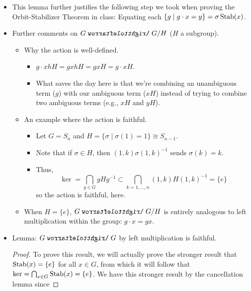 \documentclass[../notes.tex]{subfiles}
\begin{document}
\begin{itemize}
\begin{enumerate}
\begin{proof}
\begin{align*}
                \sigma^{-1}\cdot(g\cdot x) &= \sigma^{-1}\cdot(\sigma\cdot x)\\
                \sigma^{-1}g\cdot x &= x
            \end{align*}
            This implies that $\sigma^{-1}g\in H$, i.e., that $g\in\sigma H$, as desired.
        \end{proof}
    \end{enumerate}
    \item This lemma further justifies the following step we took when proving the Orbit-Stabilizer Theorem in class: Equating each $\{g\mid g\cdot x=y\}=\sigma\operatorname{Stab}(x)$.
    \item Further comments on $G\acts G/H$ ($H$ a subgroup).
    \begin{itemize}
        \item Why the action is well-defined.
        \begin{itemize}
            \item $g\cdot xhH=gxhH=gxH=g\cdot xH$.
            \item What saves the day here is that we're combining an unambiguous term ($g$) with our ambiguous term ($xH$) instead of trying to combine two ambiguous terms (e.g., $xH$ and $yH$).
        \end{itemize}
        \item An example where the action is faithful.
        \begin{itemize}
            \item Let $G=S_n$ and $H=\{\sigma\mid\sigma(1)=1\}\cong S_{n-1}$.
            \item Note that if $\sigma\in H$, then $(1,k)\sigma(1,k)^{-1}$ sends $\sigma(k)=k$.
            \item Thus,
            \begin{equation*}
                \ker = \bigcap_{g\in G}gHg^{-1} 
                \subset \bigcap_{k=1,\dots,n}(1,k)H(1,k)^{-1}
                = \{e\}
            \end{equation*}
            so the action is faithful, here.
        \end{itemize}
        \item When $H=\{e\}$, $G\acts G/H$ is entirely analogous to left multiplication within the group: $g\cdot x=gx$.
    \end{itemize}
    \item Lemma: $G\acts G$ by left multiplication is faithful.
    \begin{proof}
        To prove this result, we will actually prove the stronger result that $\operatorname{Stab}(x)=\{e\}$ for all $x\in G$, from which it will follow that $\ker=\bigcap_{x\in G}\operatorname{Stab}(x)=\{e\}$. We have this stronger result by the cancellation lemma since

\end{proof}
\end{itemize}
\end{document}
